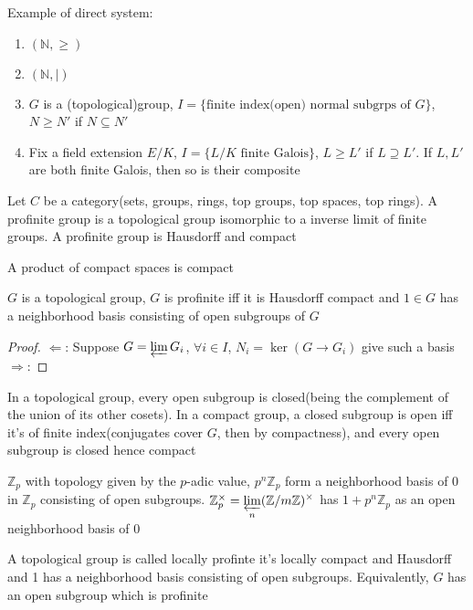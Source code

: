 \documentclass[main]{subfiles}
\begin{document}
Example of direct system:
\begin{enumerate}
\item $(\mathbb N,\geq)$
\item $(\mathbb N,|)$
\item $G$ is a (topological)group, $I=\{\text{finite index(open) normal subgrps of }G\}$, $N\geq N'$ if $N\subseteq N'$
\item Fix a field extension $E/K$, $I=\{L/K\text{ finite Galois}\}$, $L\geq L'$ if $L\supseteq L'$. If $L,L'$ are both finite Galois, then so is their composite
\end{enumerate}

Let $C$ be a category(sets, groups, rings, top groups, top spaces, top rings). A profinite group is a topological group isomorphic to a inverse limit of finite groups. A profinite group is Hausdorff and compact

\begin{theorem}
A product of compact spaces is compact
\end{theorem}

\begin{theorem}
$G$ is a topological group, $G$ is profinite iff it is Hausdorff compact and $1\in G$ has a neighborhood basis consisting of open subgroups of $G$
\end{theorem}

\begin{proof}
$\Leftarrow$: Suppose $G=\varprojlim G_i$, $\forall i\in I$, $N_i=\ker(G\to G_i)$ give such a basis \\
$\Rightarrow$:
\end{proof}

\begin{remark}
In a topological group, every open subgroup is closed(being the complement of the union of its other cosets). In a compact group, a closed subgroup is open iff it's of finite index(conjugates cover $G$, then by compactness), and every open subgroup is closed hence compact
\end{remark}

\begin{example}
$\mathbb Z_p$ with topology given by the $p$-adic value, $p^n\mathbb Z_p$ form a neighborhood basis of 0 in $\mathbb Z_p$ consisting of open subgroups. $\mathbb Z_p^\times=\displaystyle\varprojlim_n(\mathbb Z/m\mathbb Z)^\times$ has $1+p^n\mathbb Z_p$ as an open neighborhood basis of 0
\end{example}

\begin{remark}
A topological group is called locally profinte it's locally compact and Hausdorff and 1 has a neighborhood basis consisting of open subgroups. Equivalently, $G$ has an open subgroup which is profinite
\end{remark}
\end{document}
